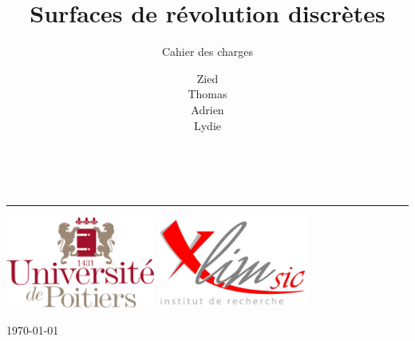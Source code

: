 \documentclass{scrartcl}
\title{Surfaces de révolution discrètes}
\subtitle{Cahier des charges}
\author{
	Zied \bsc{Ben Othmane}\\
	Thomas \bsc{Benoist}\\
	Adrien \bsc{Bisutti}\\
	Lydie \bsc{Richaume}
}
\makeatletter
\let\titleName\@title
\let\subtitleName\@subtitle
\let\authorName\@author
\makeatother
\begin{document}

\begin{titlepage}
	
	\begin{center}
		\fontsize{30}{36}\selectfont\bfseries
		\titleName\\
		\rule{6cm}{0.5pt} %
	\end{center}
	
	\begin{center}
		\LARGE
		\subtitleName
	\end{center}
	\vspace{1cm}
	
	\begin{center}
		\authorName
	\end{center}
	\vfill
	\begin{center}
		\includegraphics[height=3cm]{../Images/logo_univ_poitiers.png}
		\hfill
		\includegraphics[height=3cm]{../Images/logo-Xlim.png}
	\end{center}
	\vfill
	
	\begin{center}
		\today
	\end{center}
\end{titlepage}
\newpage




\tableofcontents
\newpage
\end{document}
